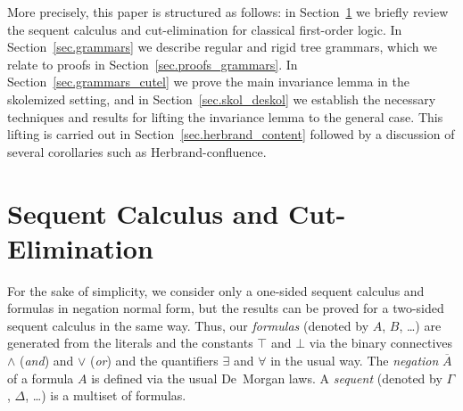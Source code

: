 \documentclass{LMCS}
\theoremstyle{plain}
\theoremstyle{definition}
\def\wcneg#1{\overline{#1}}
\newcommand{\dual}[1]{\wcneg{#1}}
\begin{document}
More precisely, this paper is structured as follows: in
Section~\ref{sec.seqcalc_cutelim} we briefly review the sequent
calculus and cut-elimination for classical first-order logic. In
Section~\ref{sec.grammars} we describe regular and rigid tree grammars,
which we relate to proofs in Section~\ref{sec.proofs_grammars}. In
Section~\ref{sec.grammars_cutel} we prove the main invariance lemma in
the skolemized setting, and in Section~\ref{sec.skol_deskol} we
establish the necessary techniques and results for lifting the
invariance lemma to the general case. This lifting is carried out in
Section~\ref{sec.herbrand_content} followed by a discussion of several
corollaries such as Herbrand-confluence.




\section{Sequent Calculus and Cut-Elimination}\label{sec.seqcalc_cutelim}

For the sake of simplicity, we consider only a one-sided sequent
calculus and formulas in negation normal form, but the results can be
proved for a two-sided sequent calculus in the same way. Thus, our
\emph{formulas} (denoted by $A$, $B$, \ldots) are generated from the
literals and the constants $\top$ and $\bot$ via the binary
connectives $\land$ (\emph{and}) and $\lor$ (\emph{or}) and the
quantifiers $\exists$ and $\forall$ in the usual way. The
\emph{negation} $\dual{A}$ of a formula $A$ is defined via the usual
De~Morgan laws. A \emph{sequent} (denoted by $\Gamma$, $\Delta$,
\ldots) is a multiset of formulas.
\end{document}
